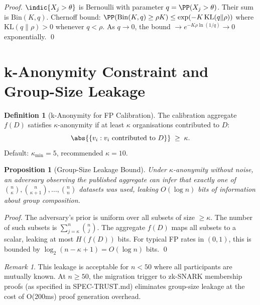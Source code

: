\documentclass[12pt,a4paper]{article}
\newtheorem{proposition}[theorem]{Proposition}
\theoremstyle{definition}
\newtheorem{definition}[theorem]{Definition}
\theoremstyle{remark}
\newtheorem{remark}[theorem]{Remark}
\begin{document}
\begin{proof}
$\indic{X_j>\theta}$ is Bernoulli with parameter $q=\PP(X_j>\theta)$.
Their sum is $\mathrm{Bin}(K,q)$.  Chernoff bound:
$\PP(\mathrm{Bin}(K,q)\ge \rho K) \le \exp(-K\,\mathrm{KL}(q\|\rho))$ where
$\mathrm{KL}(q\|\rho)>0$ whenever $q<\rho$.
As $q\to 0$, the bound $\to e^{-K\rho\ln(1/q)}\to 0$ exponentially. \qed
\end{proof}

\section{k-Anonymity Constraint and Group-Size Leakage}
\label{sec:kanon}

\begin{definition}[k-Anonymity for FP Calibration]
The calibration aggregate $f(D)$ satisfies $\kappa$-anonymity if at least $\kappa$
organisations contributed to $D$:
\begin{equation}
  \abs{\{v_i : v_i \text{ contributed to } D\}} \;\ge\; \kappa.
  \label{eq:kanon}
\end{equation}
Default: $\kappa_{\min}=5$, recommended $\kappa=10$.
\end{definition}

\begin{proposition}[Group-Size Leakage Bound]
Under $\kappa$-anonymity without noise, an adversary observing the published
aggregate can infer that exactly one of $\binom{n}{\kappa}, \binom{n}{\kappa+1},\dots,\binom{n}{n}$
datasets was used, leaking $O(\log n)$ bits of information about group composition.
\end{proposition}

\begin{proof}
The adversary's prior is uniform over all subsets of size $\ge\kappa$.
The number of such subsets is $\sum_{j=\kappa}^n \binom{n}{j}$.  The aggregate
$f(D)$ maps all subsets to a scalar, leaking at most $H(f(D))$ bits.  For typical
FP rates in $(0,1)$, this is bounded by $\log_2(n-\kappa+1) = O(\log n)$ bits. \qed
\end{proof}

\begin{remark}
This leakage is acceptable for $n<50$ where all participants are mutually known.
At $n\ge 50$, the migration trigger to zk-SNARK membership proofs (as specified in
SPEC-TRUST.md) eliminates group-size leakage at the cost of O(200ms) proof
generation overhead.
\end{remark}
\end{document}

